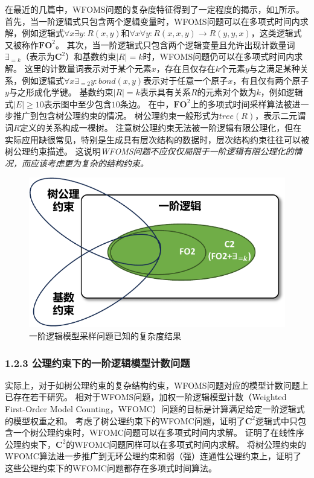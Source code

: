 \documentclass[12pt,UTF8,AutoFakeBold=3,a4paper]{ctexart} %
\newcommand{\fotwo}{\ensuremath{\mathbf{FO}^2}}
\newcommand{\ctwo}{\ensuremath{\mathbf{C}^2}}
\begin{document}
在最近的几篇中，WFOMS问题的复杂度特征得到了一定程度的揭示，如\cref{fig:hardness_results}所示。
首先，当一阶逻辑式只包含两个逻辑变量时，WFOMS问题可以在多项式时间内求解，例如逻辑式$\forall x\exists y: R(x,y)$和$\forall x\forall y: R(x,x,y) \to R(y,y,x)$，这类逻辑式又被称作\fotwo{}。
其次，当一阶逻辑式只包含两个逻辑变量且允许出现计数量词$\exists_{=k}$（表示为\ctwo{}）和基数约束$|R| = k$时，WFOMS问题仍可以在多项式时间内求解。
这里的计数量词表示对于某个元素$x$，存在且仅存在$k$个元素$y$与之满足某种关系，例如逻辑式$\forall x\exists_{=2} y: bond(x,y)$表示对于任意一个原子$x$，有且仅有两个原子$y$与之形成化学键。
基数约束$|R| = k$表示具有关系$R$的元素对个数为$k$，例如逻辑式$|E| \ge 10$表示图中至少包含$10$条边。
在中，\fotwo{}上的多项式时间采样算法被进一步推广到包含树公理约束的情况。
树公理约束一般形式为$tree(R)$，表示二元谓词$R$定义的关系构成一棵树。
注意树公理约束无法被一阶逻辑有限公理化，但在实际应用缺很常见，特别是生成具有层次结构的数据时，层次结构约束往往可以被树公理约束描述。
这说明\emph{WFOMS问题不应仅仅局限于一阶逻辑有限公理化的情况，而应该考虑更为复杂的结构约束。}

\begin{figure}[tbp]
  \centering
  \includegraphics[width=.5\textwidth]{figs/hardness_results.pdf}
  \caption{一阶逻辑模型采样问题已知的复杂度结果}
  \label{fig:hardness_results}
\end{figure}

\subsubsection{1.2.3 公理约束下的一阶逻辑模型计数问题}

实际上，对于如树公理约束的复杂结构约束，WFOMS问题对应的模型计数问题上已存在若干研究。
相对于WFOMS问题，加权一阶逻辑模型计数（Weighted First-Order Model Counting，WFOMC）问题的目标是计算满足给定一阶逻辑式的模型权重之和。
考虑了树公理约束下的WFOMC问题，证明了\ctwo{}逻辑式中只包含一个树公理约束时，WFOMC问题可以在多项式时间内求解。
证明了在线性序公理约束下，\ctwo{}的WFOMC问题同样可以在多项式时间内求解。
将树公理约束的WFOMC算法进一步推广到无环公理约束和弱（强）连通性公理约束上，证明了这些公理约束下的WFOMC问题都存在多项式时间算法。
\end{document}
